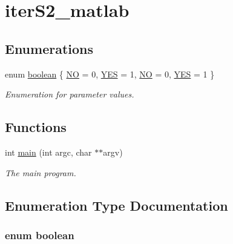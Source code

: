 \hypertarget{group__applications__iterS2__matlab}{
\section{iterS2\_\-matlab}
\label{group__applications__iterS2__matlab}
}
\subsection*{Enumerations}
\begin{CompactItemize}
\item 
enum \hyperlink{group__applications__iterS2__matlab_g7c6368b321bd9acd0149b030bb8275ed}{boolean} \{ \hyperlink{group__applications__quadratureS2__test_gg7c6368b321bd9acd0149b030bb8275ed0d077f5b932ce05e5b9f30c6087a2f31}{NO} =  0, 
\hyperlink{group__applications__quadratureS2__test_gg7c6368b321bd9acd0149b030bb8275ed99f136a862ba5c7d16967231c29f09d6}{YES} =  1, 
\hyperlink{group__applications__quadratureS2__test_gg7c6368b321bd9acd0149b030bb8275ed0d077f5b932ce05e5b9f30c6087a2f31}{NO} =  0, 
\hyperlink{group__applications__quadratureS2__test_gg7c6368b321bd9acd0149b030bb8275ed99f136a862ba5c7d16967231c29f09d6}{YES} =  1
 \}
\begin{CompactList}\small\item\em Enumeration for parameter values. \item\end{CompactList}\end{CompactItemize}
\subsection*{Functions}
\begin{CompactItemize}
\item 
int \hyperlink{group__applications__iterS2__matlab_g3c04138a5bfe5d72780bb7e82a18e627}{main} (int argc, char $\ast$$\ast$argv)
\begin{CompactList}\small\item\em The main program. \item\end{CompactList}\end{CompactItemize}


\subsection{Enumeration Type Documentation}
\hypertarget{group__applications__iterS2__matlab_g7c6368b321bd9acd0149b030bb8275ed}{
\subsubsection{\setlength{\rightskip}{0pt plus 5cm}enum {\bf boolean}}}
\label{group__applications__iterS2__matlab_g7c6368b321bd9acd0149b030bb8275ed}


